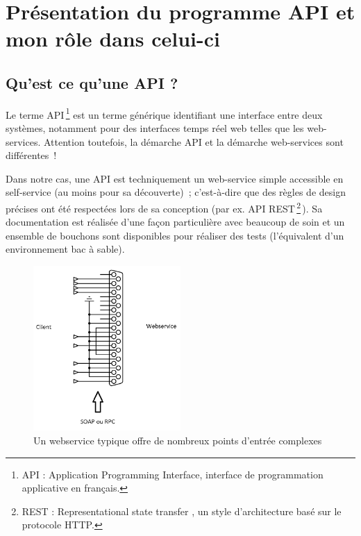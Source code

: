 \section{Présentation du programme API et mon rôle dans celui-ci}
\label{p2}

    \subsection{Qu'est ce qu'une API ?}

    Le terme API\,\footnote{API : \foreignlanguage{english}{Application Programming Interface}, interface de programmation applicative en français.} est un terme générique identifiant une interface entre deux systèmes, notamment pour des interfaces temps réel web telles que les web-services.
    Attention toutefois, la démarche API et la démarche web-services sont différentes !

    Dans notre cas, une API est techniquement un web-service simple  accessible en self-service (au moins pour sa découverte) ;
    c’est-à-dire que des règles de design précises ont été respectées lors de sa conception (par ex. API REST\,\footnote{REST : \foreignlanguage{english}{Representational state transfer} , un style d'architecture basé sur le protocole HTTP.}\,).
    Sa documentation est réalisée d’une façon particulière avec beaucoup de soin et un ensemble de bouchons sont disponibles pour réaliser des tests (l'équivalent d'un environnement bac à sable).

    \begin{figure}[!ht]
        \center
        \includegraphics[width=0.5\textwidth]{./images/webservice.jpg}
        \caption{Un webservice typique offre de nombreux points d'entrée complexes}
    \end{figure}

